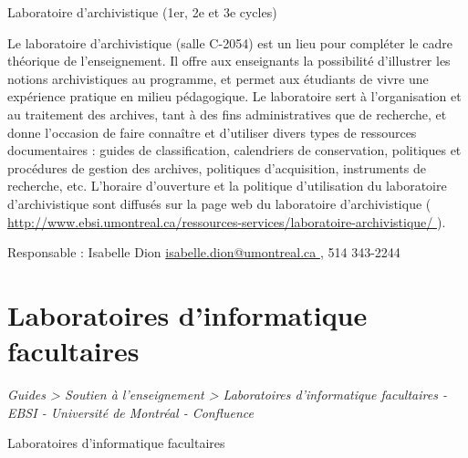 \documentclass [12 pt]{article}
\begin{document}
        Laboratoire d'archivistique (1er, 2e et 3e cycles)
        
            Le laboratoire d'archivistique (salle C-2054) est un lieu pour compléter le cadre
                théorique de l'enseignement. Il offre aux enseignants la possibilité d'illustrer les
                notions archivistiques au programme, et permet aux étudiants de vivre une expérience
                pratique en milieu pédagogique.
            Le laboratoire sert à l'organisation et au traitement des archives, tant à des fins
                administratives que de recherche, et donne l'occasion de faire connaître et
                d'utiliser divers types de ressources documentaires : guides de classification,
                calendriers de conservation, politiques et procédures de gestion des archives,
                politiques d'acquisition, instruments de recherche, etc.
            L'horaire d'ouverture et la politique d'utilisation du laboratoire d'archivistique
                sont diffusés sur la page web du laboratoire d'archivistique (
        \href{
        http://www.ebsi.umontreal.ca/ressources-services/laboratoire-archivistique/
        } {
        http://www.ebsi.umontreal.ca/ressources-services/laboratoire-archivistique/
        }
    ).
            
                Responsable : Isabelle Dion
        \href{
        mailto:isabelle.dion@umontreal.ca
        } {
        isabelle.dion@umontreal.ca
        }
    , 514
                    343-2244
            
        
    
    
        \newpage
        \section {
        Laboratoires d'informatique facultaires
        }
        
        
        
        \textit{
        Guides > Soutien à l'enseignement > Laboratoires d'informatique
            facultaires - EBSI - Université de Montréal - Confluence
        }
    
        Laboratoires d'informatique facultaires
        
\end{document}
